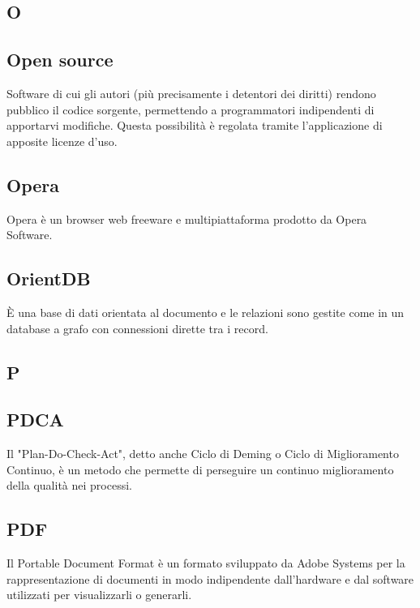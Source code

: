 \newpage

\begin{center}
\Huge\section*{\uppercase{O}}
\end{center}

\subsection*{Open source}
Software di cui gli autori (più precisamente i detentori dei diritti) rendono pubblico
il codice sorgente, permettendo a programmatori indipendenti di apportarvi modifiche.
Questa possibilità è regolata tramite l'applicazione di apposite licenze d'uso.

\subsection*{Opera}
Opera è un browser web freeware e multipiattaforma prodotto da Opera Software.

\subsection*{OrientDB}
È una base di dati orientata al documento e le relazioni sono gestite come in un database a grafo con connessioni dirette tra i record.

\newpage

\begin{center}
\Huge\section*{\uppercase{P}}
\end{center}

\subsection*{PDCA}
Il "Plan-Do-Check-Act", detto anche Ciclo di Deming o Ciclo di Miglioramento Continuo,
è un metodo che permette di perseguire un continuo miglioramento della qualità nei processi.

\subsection*{PDF}
Il Portable Document Format è un formato sviluppato da Adobe Systems per la rappresentazione di documenti in modo indipendente dall'hardware e dal software utilizzati per
visualizzarli o generarli.

